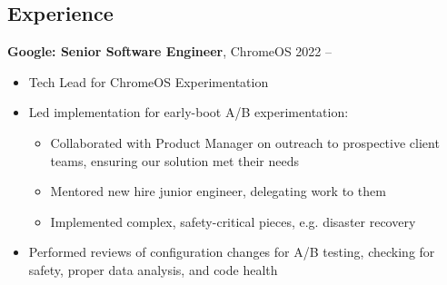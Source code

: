 \documentclass[margin]{res} \usepackage{hyperref}
\begin{document}

\address{
  \href{mailto:miriam@mutexlox.com}{miriam@mutexlox.com} \\
}
\address{  %
  \hfill \href{https://mutexlox.com}{https://mutexlox.com} \\
}

\begin{resume}


\section{Experience}
  \textbf{Google: Senior Software Engineer}, ChromeOS \hfill 2022 --
  \begin{minipage}{0.84\textwidth}
    \vspace{0.2em}
    \begin{itemize} \itemsep -1pt
        \item Tech Lead for ChromeOS Experimentation
        \item Led implementation for early-boot A/B experimentation:
          \vspace{-0.5em}
          \begin{itemize} \itemsep -1pt
              \item Collaborated with Product Manager on outreach to
                prospective client teams, ensuring our solution met their needs
              \item Mentored new hire junior engineer, delegating work to them
              \item Implemented complex, safety-critical pieces, e.g.
                disaster recovery
          \end{itemize}
        \item Performed reviews of configuration changes for A/B testing,
          checking for safety, proper data analysis, and code health
    \end{itemize}
  \end{minipage}


\end{resume}
\end{document}

